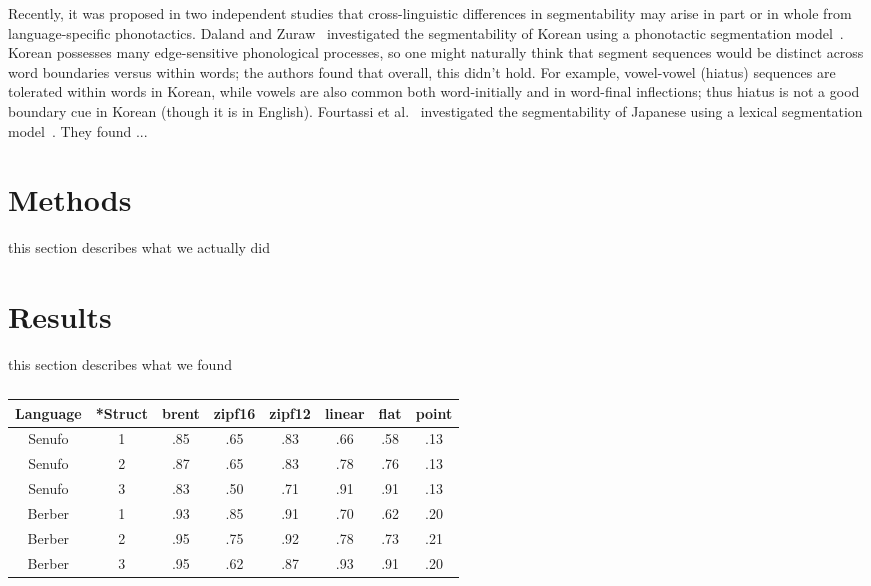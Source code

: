 \documentclass[11pt]{article}
\begin{document}
Recently, it was proposed in two independent studies that cross-linguistic differences in segmentability may arise in part or in whole from language-specific phonotactics. Daland and Zuraw~ investigated the segmentability of Korean using a phonotactic segmentation model~\cite{DP11}. Korean possesses many edge-sensitive phonological processes, so one might naturally think that segment sequences would be distinct across word boundaries versus within words; the authors found that overall, this didn't hold. For example, vowel-vowel (hiatus) sequences are tolerated within words in Korean, while vowels are also common both word-initially and in word-final inflections; thus hiatus is not a good boundary cue in Korean (though it is in English). Fourtassi et al.~ investigated the segmentability of Japanese using a lexical segmentation model~\cite{GGJ09}. They found ...


\section{Methods}

this section describes what we actually did

\section{Results}

this section describes what we found

\begin{table}[h]
\begin{center}
\begin{tabular}{|c||c|cccccc|}
  \hline
  Language & *Struct & brent & zipf16 & zipf12 & linear & flat & point \\
  \hline
  Senufo & 1 & .85 & .65 & .83 & .66 & .58 & .13 \\
  Senufo & 2 & .87 & .65 & .83 & .78 & .76 & .13 \\
  Senufo & 3 & .83 & .50 & .71 & .91 & .91 & .13 \\
  \hline
  Berber & 1 & .93 & .85 & .91 & .70 & .62 & .20 \\
  Berber & 2 & .95 & .75 & .92 & .78 & .73 & .21 \\
  Berber & 3 & .95 & .62 & .87 & .93 & .91 & .20 \\
  \hline
\end{tabular}
\end{center}
\caption{\label{Results.}}
\end{table}
\end{document}
